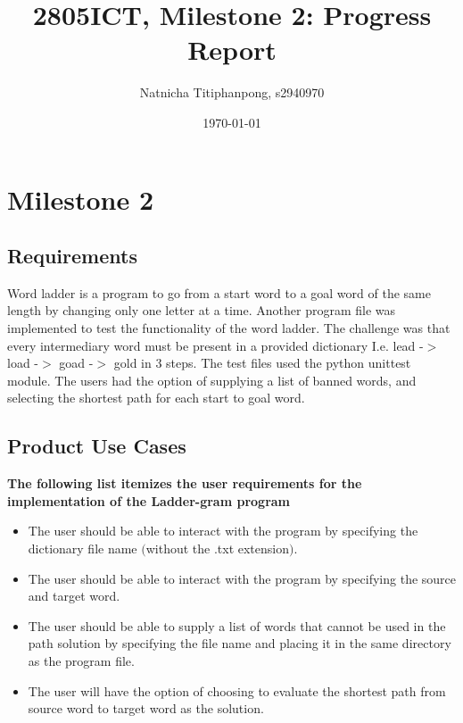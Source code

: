 \documentclass[12pt, a4]{report}
\title{2805ICT, Milestone 2: Progress Report}
\author{Natnicha Titiphanpong, s2940970}%
\date{\today}
\begin{document}
	
	\begin{titlepage}
		\maketitle
	\end{titlepage}
	\tableofcontents
	\pagebreak
	\section{Milestone 2}
	\subsection{Requirements}
	\par Word ladder is a program to go from a start word to a goal word of the same length by changing only one
	letter at a time. Another program file was implemented to test the functionality of the word ladder. The challenge was that every intermediary word must be present in a provided dictionary I.e. lead -$>$ load -$>$ goad -$>$ gold in 3 steps. The test files used the python unittest module. The users had the option of supplying a list of banned words, and selecting the shortest path for each start to goal word. 
	
	\subsection{Product Use Cases}
	\textbf{The following list itemizes the user requirements for the implementation of the Ladder-gram program}
	\begin{itemize}
		\item The user should be able to interact with the program by specifying the dictionary file name $($without the .txt extension$)$.
		\item The user should be able to interact with the program by specifying the source and target word.
		\item The user should be able to supply a list of words that cannot be used in the path solution by specifying the file name and placing it in the same directory as the program file.
		\item The user will have the option of choosing to evaluate the shortest path from source word to target word as the solution.
	\end{itemize}
	
\end{document}
